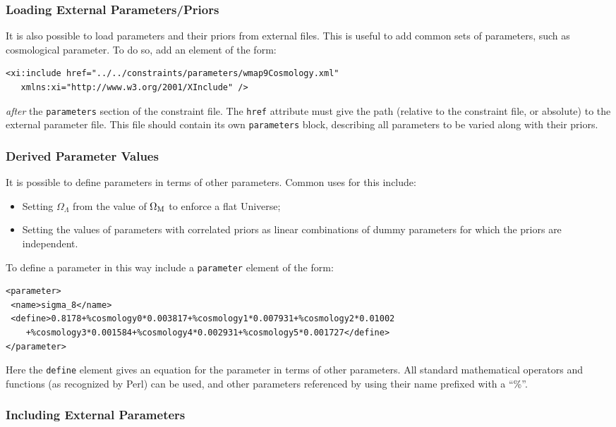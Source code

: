 \subsubsection{Loading External Parameters/Priors}

It is also possible to load parameters and their priors from external files. This is useful to add common sets of parameters, such as cosmological parameter. To do so, add an element of the form:
\begin{verbatim}
<xi:include href="../../constraints/parameters/wmap9Cosmology.xml" 
   xmlns:xi="http://www.w3.org/2001/XInclude" />
\end{verbatim}
\emph{after} the {\tt parameters} section of the constraint file. The {\tt href} attribute must give the path (relative to the constraint file, or absolute) to the external parameter file. This file should contain its own {\tt parameters} block, describing all parameters to be varied along with their priors. 

\subsubsection{Derived Parameter Values}

It is possible to define parameters in terms of other parameters. Common uses for this include:
\begin{itemize}
 \item Setting $\Omega_\Lambda$ from the value of $\Omega_{\rm M}$ to enforce a flat Universe;
 \item Setting the values of parameters with correlated priors as linear combinations of dummy parameters for which the priors are independent.
\end{itemize}
To define a parameter in this way include a {\tt parameter} element of the form:
\begin{verbatim}
<parameter>
 <name>sigma_8</name>
 <define>0.8178+%cosmology0*0.003817+%cosmology1*0.007931+%cosmology2*0.01002
    +%cosmology3*0.001584+%cosmology4*0.002931+%cosmology5*0.001727</define>
</parameter>
\end{verbatim}
Here the {\tt define} element gives an equation for the parameter in terms of other parameters. All standard mathematical operators and functions (as recognized by Perl) can be used, and other parameters referenced by using their name prefixed with a ``\%''.

\subsubsection{Including External Parameters}

